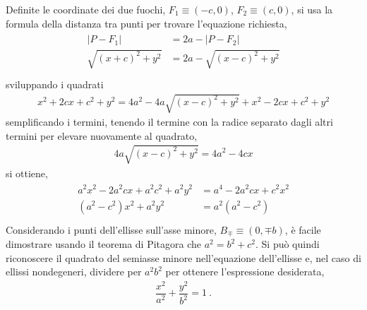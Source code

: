 \documentclass[letterpaper,10pt,italian]{jupyterBook}
\begin{document}
\sphinxAtStartPar
Definite le coordinate dei due fuochi, \(F_1 \equiv (-c,0)\), \(F_2 \equiv (c,0)\), si usa la formula della distanza tra punti per trovare l’equazione richiesta,
\begin{equation*}
\begin{split}\begin{aligned}
  |P - F_1|  & = 2 a - |P - F_2| \\
  \sqrt{(x+c)^2 + y^2} & = 2a - \sqrt{(x-c)^2 + y^2} \\
\end{aligned}\end{split}
\end{equation*}
\sphinxAtStartPar
sviluppando i quadrati
\begin{equation*}
\begin{split}x^2 + 2 c x + c^2 + y^2 = 4 a^2 - 4a \sqrt{(x-c)^2 + y^2} + x^2 - 2 c x + c^2 + y^2\end{split}
\end{equation*}
\sphinxAtStartPar
semplificando i termini, tenendo il termine con la radice separato dagli altri termini per elevare nuovamente al quadrato,
\begin{equation*}
\begin{split}4a \sqrt{(x-c)^2 + y^2} = 4 a^2 - 4 c x\end{split}
\end{equation*}
\sphinxAtStartPar
si ottiene,
\begin{equation*}
\begin{split}\begin{aligned}
  a^2 x^2-2 a^2 c x + a^2 c^2 + a^2 y^2 & = a^4 - 2 a^2 c x + c^2 x^2 \\
  (a^2 - c^2)x^2 + a^2 y^2 & = a^2 ( a^2 - c^2 ) \\
\end{aligned}\end{split}
\end{equation*}
\sphinxAtStartPar
Considerando i punti dell’ellisse sull’asse minore, \(B_{\mp} \equiv (0, \mp b)\), è facile dimostrare usando il teorema di Pitagora che \(a^2 = b^2 + c^2\). Si può quindi riconoscere il quadrato del semiasse minore nell’equazione dell’ellisse e, nel caso di ellissi non\sphinxhyphen{}degeneri, dividere per \(a^2 b^2\) per ottenere l’espressione desiderata,
\begin{equation*}
\begin{split}\dfrac{x^2}{a^2} + \dfrac{y^2}{b^2} = 1 \ .\end{split}
\end{equation*}
\end{document}
